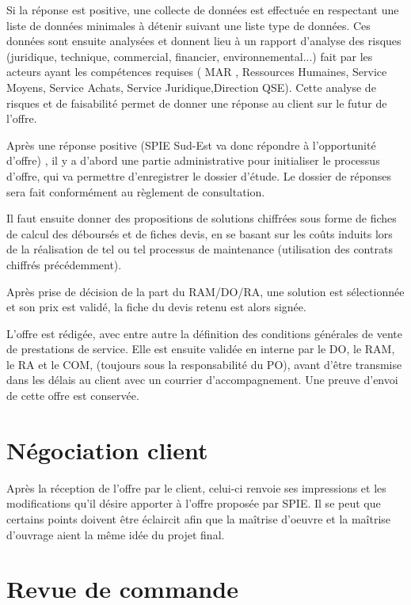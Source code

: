 Si la réponse est positive, une collecte de données est effectuée en respectant une liste de données minimales à détenir suivant une liste type de données. Ces données sont ensuite analysées et donnent lieu à un rapport d’analyse des risques (juridique, technique, commercial, financier, environnemental...)  fait par les acteurs ayant les compétences requises ( MAR , Ressources Humaines, Service Moyens, Service Achats, Service Juridique,Direction QSE). Cette analyse de risques et de faisabilité permet de donner une réponse au client sur le futur de l’offre.

Après une réponse positive (SPIE Sud-Est va donc répondre à l’opportunité d’offre) , il y a d’abord une partie administrative pour initialiser le processus d’offre, qui va permettre d’enregistrer le dossier d’étude. Le dossier de réponses sera fait conformément au règlement de consultation.

Il faut ensuite donner des propositions de solutions chiffrées sous forme de fiches de calcul des déboursés et de fiches devis, en se basant sur les coûts induits lors de la réalisation de tel ou tel processus de maintenance (utilisation des contrats chiffrés précédemment).

Après prise de décision de la part du RAM/DO/RA, une solution est sélectionnée et son prix est validé, la fiche du devis retenu est alors signée.

L’offre est rédigée, avec entre autre la définition des conditions générales de vente de prestations de service. Elle est ensuite validée en interne par le DO, le RAM, le RA et le COM, (toujours sous la responsabilité du PO), avant d’être transmise dans les délais au client avec un courrier d’accompagnement. Une preuve d’envoi de cette offre est conservée.

\section{Négociation client}

Après la réception de l’offre par le client, celui-ci renvoie ses impressions et les modifications qu’il désire apporter à l’offre proposée par SPIE. Il se peut que certains points doivent être éclaircit afin que la maîtrise d’oeuvre et la maîtrise d’ouvrage aient la même idée du projet final.

\section{Revue de commande}

